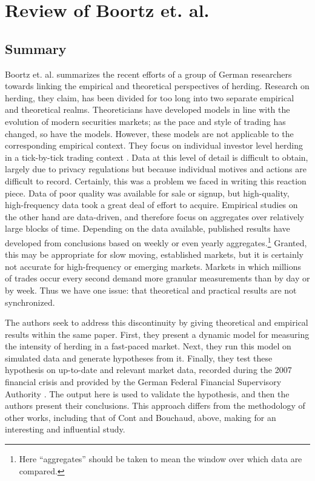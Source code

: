 \documentclass{article}
\begin{document}
\section{Review of Boortz et. al.}
\subsection{Summary}
  Boortz et. al. summarizes the recent efforts of a group of German researchers towards linking the empirical and theoretical perspectives of herding. 
  Research on herding, they claim, has been divided for too long into two separate empirical and theoretical realms.
  Theoreticians have developed models in line with the evolution of modern securities markets; as the pace and style of trading has changed, so have the models.
  However, these models are not applicable to the corresponding empirical context.
  They focus on individual investor level herding in a tick-by-tick trading context \cite[2]{boortz}.
  Data at this level of detail is difficult to obtain, largely due to privacy regulations but because individual motives and actions are difficult to record.
  Certainly, this was a problem we faced in writing this reaction piece. Data of poor quality was available for sale or signup, but high-quality, high-frequency data took a great deal of effort to acquire.
  Empirical studies on the other hand are data-driven, and therefore focus on aggregates over relatively large blocks of time.
  Depending on the data available, published results have developed from conclusions based on weekly or even yearly aggregates.\footnote{
    Here ``aggregates'' should be taken to mean the window over which data are compared. 
  }
  Granted, this may be appropriate for slow moving, established markets, but it is certainly not accurate for high-frequency or emerging markets.
  Markets in which millions of trades occur every second demand more granular measurements than by day or by week.
  Thus we have one issue: that theoretical and practical results are not synchronized.

  The authors seek to address this discontinuity by giving theoretical and empirical results within the same paper.
  First, they present a dynamic model for measuring the intensity of herding in a fast-paced market.
  Next, they run this model on simulated data and generate hypotheses from it.
  Finally, they test these hypothesis on up-to-date and relevant market data, recorded during the 2007 financial crisis and provided by the German Federal Financial Supervisory Authority \cite[3]{boortz}.
  The output here is used to validate the hypothesis, and then the authors present their conclusions.
  This approach differs from the methodology of other works, including that of Cont and Bouchaud, above, making for an interesting and influential study.
\end{document}
